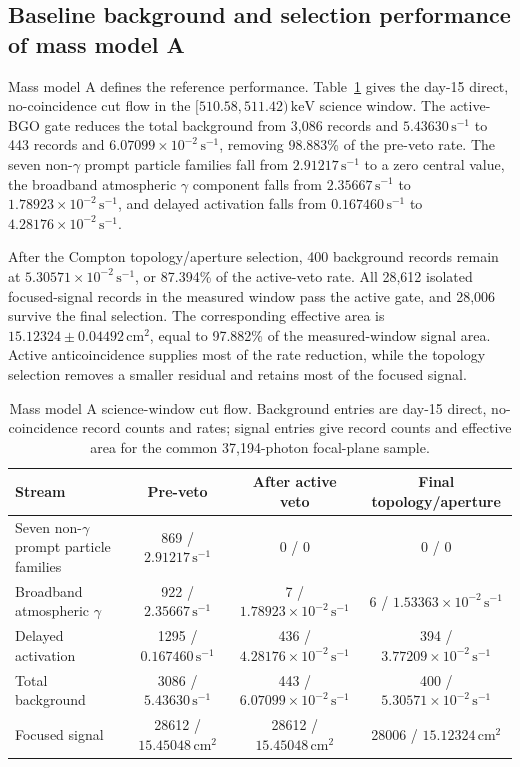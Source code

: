 \documentclass[11pt]{article}
\newcommand{\revblue}[1]{\textcolor{revisionblue}{#1}}
\newcommand{\keV}{\ensuremath{\,\mathrm{keV}}}
\newcommand{\cps}{\ensuremath{\,\mathrm{s^{-1}}}}
\begin{document}
\subsection{Baseline background and selection performance of mass model A}
\label{subsec:model_a_baseline}
\label{subsec:reference_background_results}

Mass model A defines the reference performance. Table~\ref{tab:phase2_cutflow} gives the day-15 direct, no-coincidence cut flow in the $[510.58,511.42)\keV$ science window. The active-BGO gate reduces the total background from 3,086 records and $5.43630\cps$ to 443 records and $6.07099\times10^{-2}\cps$, removing 98.883\% of the pre-veto rate. The \revblue{seven non-$\gamma$ prompt particle families} fall from $2.91217\cps$ to a zero central value, the broadband atmospheric $\gamma$ component falls from $2.35667\cps$ to $1.78923\times10^{-2}\cps$, and delayed activation falls from $0.167460\cps$ to $4.28176\times10^{-2}\cps$.

After the Compton topology/aperture selection, 400 background records remain at $5.30571\times10^{-2}\cps$, or 87.394\% of the active-veto rate. All 28,612 isolated focused-signal records in the measured window pass the active gate, and 28,006 survive the final selection. The corresponding effective area is $15.12324\pm0.04492\,\mathrm{cm^2}$, equal to 97.882\% of the measured-window signal area. Active anticoincidence supplies most of the rate reduction, while the topology selection removes a smaller residual and retains most of the focused signal.

\begin{table}[H]
\centering
\caption{Mass model A science-window cut flow. Background entries are day-15 direct, no-coincidence record counts and rates; signal entries give record counts and effective area for the common 37,194-photon focal-plane sample.}
\label{tab:phase2_cutflow}
\footnotesize
\begin{tabular}{lccc}
\toprule
Stream & Pre-veto & After active veto & Final topology/aperture \\
\midrule
\revblue{Seven non-$\gamma$ prompt particle families} & 869 / $2.91217\cps$ & 0 / 0 & 0 / 0 \\
Broadband atmospheric $\gamma$ & 922 / $2.35667\cps$ & 7 / $1.78923\times10^{-2}\cps$ & 6 / $1.53363\times10^{-2}\cps$ \\
Delayed activation & 1295 / $0.167460\cps$ & 436 / $4.28176\times10^{-2}\cps$ & 394 / $3.77209\times10^{-2}\cps$ \\
Total background & 3086 / $5.43630\cps$ & 443 / $6.07099\times10^{-2}\cps$ & 400 / $5.30571\times10^{-2}\cps$ \\
Focused signal & 28612 / $15.45048\,\mathrm{cm^2}$ & 28612 / $15.45048\,\mathrm{cm^2}$ & 28006 / $15.12324\,\mathrm{cm^2}$ \\
\bottomrule
\end{tabular}
\end{table}
\end{document}
